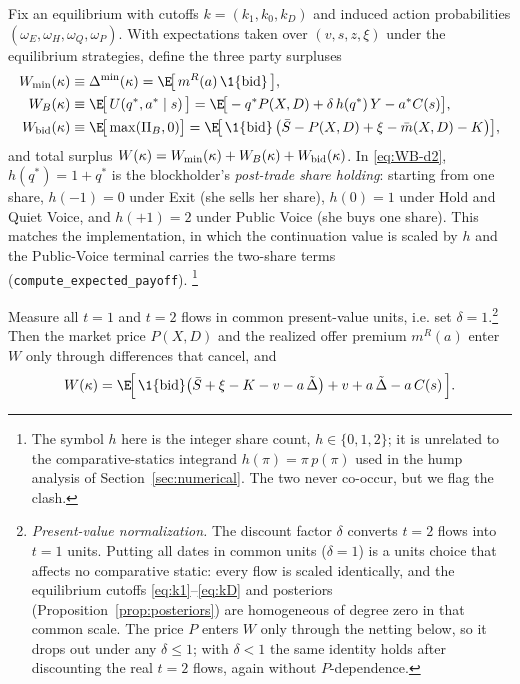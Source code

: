 Fix an equilibrium with cutoffs $k=(k_1,k_0,k_D)$ and induced action
probabilities $(\omega_E,\omega_H,\omega_Q,\omega_P)$. With expectations taken
over $(v,s,z,\xi)$ under the equilibrium strategies, define the three party
surpluses
\begin{align}
W_{\min}(\kappa) &\equiv \Delta^{\min}(\kappa)
   =\E\!\big[\,m^{R}(a)\,\1\{\textup{bid}\}\,\big], \label{eq:Wmin-d2}\\
W_B(\kappa) &\equiv \E\!\big[\,U(q^{\ast},a^{\ast}\mid s)\,\big]
   =\E\!\big[-q^{\ast}P(X,D)+\delta\,h(q^{\ast})\,Y-a^{\ast}C(s)\big],
   \label{eq:WB-d2}\\
W_{\textup{bid}}(\kappa) &\equiv \E\!\big[\max(\Pi_B,0)\big]
   =\E\!\big[\,\1\{\textup{bid}\}\,\big(\bar S-P(X,D)+\xi-\bar m(X,D)-K\big)\big],
   \label{eq:Wbid-d2}
\end{align}
and total surplus $W(\kappa)=W_{\min}(\kappa)+W_B(\kappa)+W_{\textup{bid}}(\kappa)$.
In \eqref{eq:WB-d2}, $h(q^{\ast})=1+q^{\ast}$ is the blockholder's
\emph{post-trade share holding}: starting from one share, $h(-1)=0$ under Exit
(she sells her share), $h(0)=1$ under Hold and Quiet Voice, and $h(+1)=2$ under
Public Voice (she buys one share). This matches the implementation, in which the
continuation value is scaled by $h$ and the Public-Voice terminal carries the
two-share terms (\texttt{compute\_expected\_payoff}).%
\footnote{The symbol $h$ here is the integer share count, $h\in\{0,1,2\}$; it is
unrelated to the comparative-statics integrand $h(\pi)=\pi\,p(\pi)$ used in the
hump analysis of Section~\ref{sec:numerical}. The two never co-occur, but we flag
the clash.}

\begin{lemma}
\label{lem:transfer-netting}
Measure all $t=1$ and $t=2$ flows in common present-value units, i.e. set
$\delta=1$.\footnote{\label{fn:pv-norm}\emph{Present-value normalization.} The
discount factor $\delta$ converts $t=2$ flows into $t=1$ units. Putting all dates
in common units ($\delta=1$) is a units choice that affects no comparative
static: every flow is scaled identically, and the equilibrium cutoffs
\eqref{eq:k1}--\eqref{eq:kD} and posteriors (Proposition~\ref{prop:posteriors})
are homogeneous of degree zero in that common scale. The price $P$ enters $W$
only through the netting below, so it drops out under any $\delta\le1$; with
$\delta<1$ the same identity holds after discounting the real $t=2$ flows, again
without $P$-dependence.} Then the market price $P(X,D)$ and the realized offer
premium $m^{R}(a)$ enter $W$ only through differences that cancel, and
\begin{equation}
W(\kappa)=\E\!\Big[\,\1\{\textup{bid}\}\big(\bar S+\xi-K-v-a\,\tilde\Delta\big)
   +v+a\,\tilde\Delta-a\,C(s)\,\Big].
\label{eq:welfare-net-d2}
\end{equation}
\end{lemma}

